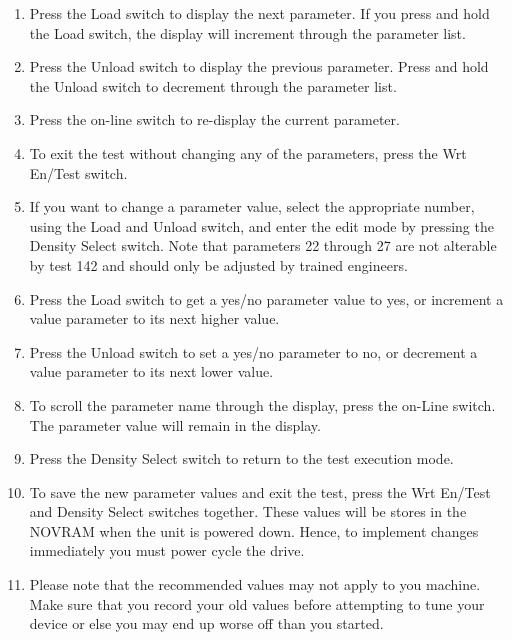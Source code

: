 \begin{enumerate}

\item Press the Load switch to display the next parameter. If you press and hold the
Load switch, the display will increment through the parameter list.

\item Press the Unload switch to display the previous parameter. Press and hold the
Unload switch to decrement through the parameter list.

\item Press the on-line switch to re-display the current parameter.

\item To exit the test without changing any of the parameters, press the Wrt En/Test
switch.

\item If you want to change a parameter value, select the appropriate number, using
the Load and Unload switch, and enter the edit mode by pressing the Density
Select switch. Note that parameters 22 through 27 are not alterable by test 142
and should only be adjusted by trained engineers.

\item Press the Load switch to get a yes/no parameter value to yes, or  increment a
value parameter to its next higher value.

\item Press the Unload switch to set a yes/no parameter to no, or decrement a value
parameter to its next lower value.

\item To scroll the parameter name through the display, press the on-Line switch. The
parameter value will remain in the display.

\item Press the Density Select switch to return to the test execution mode.

\item To save the new parameter values and exit the test, press the Wrt En/Test and
Density Select switches together. These values will be stores in the NOVRAM
when the unit is powered down. Hence, to implement changes immediately you  must
power cycle the drive.

\item Please note that the recommended values may not apply to you machine. Make sure
that you record your old values before attempting to tune your device or else
you may end up worse off than you started.

\end{enumerate}

